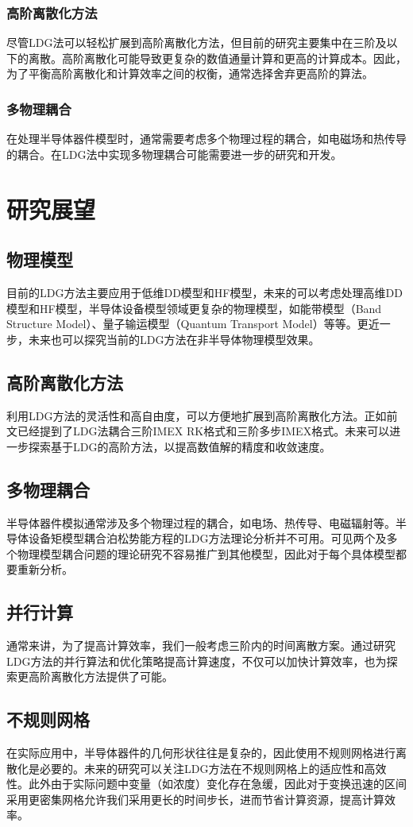 \subsubsection{高阶离散化方法}
尽管LDG法可以轻松扩展到高阶离散化方法，但目前的研究主要集中在三阶及以下的离散。高阶离散化可能导致更复杂的数值通量计算和更高的计算成本。因此，为了平衡高阶离散化和计算效率之间的权衡，通常选择舍弃更高阶的算法。
\subsubsection{多物理耦合}
在处理半导体器件模型时，通常需要考虑多个物理过程的耦合，如电磁场和热传导的耦合。在LDG法中实现多物理耦合可能需要进一步的研究和开发。

\section{研究展望}
\subsection{物理模型}
目前的LDG方法主要应用于低维DD模型和HF模型，未来的可以考虑处理高维DD模型和HF模型，半导体设备模型领域更复杂的物理模型，如能带模型（Band Structure Model）、量子输运模型（Quantum Transport Model）等等。更近一步，未来也可以探究当前的LDG方法在非半导体物理模型效果。
\subsection{高阶离散化方法}
利用LDG方法的灵活性和高自由度，可以方便地扩展到高阶离散化方法。正如前文已经提到了LDG法耦合三阶IMEX RK格式和三阶多步IMEX格式\cite{wang2016stability}。未来可以进一步探索基于LDG的高阶方法，以提高数值解的精度和收敛速度。
\subsection{多物理耦合}
半导体器件模拟通常涉及多个物理过程的耦合，如电场、热传导、电磁辐射等。半导体设备矩模型耦合泊松势能方程的LDG方法理论分析并不可用\cite{liu2010error}。可见两个及多个物理模型耦合问题的理论研究不容易推广到其他模型，因此对于每个具体模型都要重新分析。
\subsection{并行计算}
通常来讲，为了提高计算效率，我们一般考虑三阶内的时间离散方案\cite{wang2016stability}。通过研究LDG方法的并行算法和优化策略提高计算速度，不仅可以加快计算效率，也为探索更高阶离散化方法提供了可能。

\subsection{不规则网格}
在实际应用中，半导体器件的几何形状往往是复杂的，因此使用不规则网格进行离散化是必要的。未来的研究可以关注LDG方法在不规则网格上的适应性和高效性。此外由于实际问题中变量（如浓度）变化存在急缓，因此对于变换迅速的区间采用更密集网格允许我们采用更长的时间步长，进而节省计算资源，提高计算效率\cite{肖红单2023半导体}。


\newpage
\begingroup
{}
\printbibliography[title={参考文献}]
\endgroup
